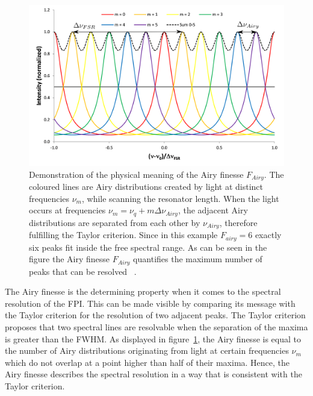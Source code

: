 \begin{figure}[H]
	\centering
	\includegraphics[width=0.8\linewidth]{figures/fabry-perot/Airy_finesse_of_a_Fabry-Perot_interferometer}
	\caption[Demonstration of the physical meaning of the Airy finesse $F_{Airy}$]{Demonstration of the physical meaning of the Airy finesse $F_{Airy}$.
		The coloured lines are Airy distributions created by light at distinct frequencies $\nu_m$, while scanning the resonator length. When the light occurs at frequencies $\nu_m = \nu_q+m\Delta \nu_{Airy}$, the adjacent Airy distributions are separated from each other by $\nu_{Airy}$, therefore fulfilling the Taylor criterion.
		Since in this example $F_{airy}=6$  exactly six peaks fit inside the free spectral range.
		As can be seen in the figure the Airy finesse $F_{Airy}$ quantifies the maximum number of peaks that can be resolved ~\cite{noauthor_fabryperot_nodate}.}
	\label{fig:airyfinesseofafabry-perotinterferometer}
\end{figure}


The Airy finesse is the determining property when it comes to the spectral resolution of the \ac{FPI}. This can be made visible by comparing its message with the Taylor criterion for the resolution of two adjacent peaks.
The Taylor criterion proposes that two spectral lines are resolvable when the separation of the maxima is greater than the \ac{FWHM}.
As displayed in figure~\ref{fig:airyfinesseofafabry-perotinterferometer}, the Airy finesse is equal to the number of Airy distributions originating from light at certain frequencies $\nu_m$ which do not overlap at a point higher than half of their maxima.
Hence, the Airy finesse describes the spectral resolution in a way that is consistent with the Taylor criterion.



